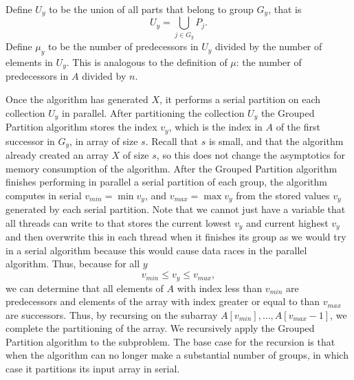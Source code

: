 \documentclass[twocolumn, twoside, 12pt]{article}
\begin{document}
Define $U_y$ to be the union of all parts that belong to group $G_y$, that is
$$U_y = \bigcup_{j\in G_y} P_j.$$
Define $\mu_y$ to be the number of predecessors in $U_y$ divided by the number of elements in $U_y$. This is analogous to the definition of $\mu$: the number of predecessors in $A$ divided by $n$.

Once the algorithm has generated $X$, it performs a serial partition on each collection $U_y$ in parallel. 
After partitioning the collection $U_y$ the Grouped Partition algorithm stores the index $v_y$, which is the index in $A$ of the first successor in $G_y$, in array of size $s$.
Recall that $s$ is small, and that the algorithm already created an array $X$ of size $s$, so this does not change the asymptotics for memory consumption of the algorithm.
After the Grouped Partition algorithm finishes performing in parallel a serial partition of each group, the algorithm computes in serial $v_{min} =\min v_y$, and $v_{max} = \max{v_y}$ from the stored values $v_y$ generated by each serial partition.
Note that we cannot just have a variable that all threads can write to that stores the current lowest $v_y$ and current highest $v_y$ and then overwrite this in each thread when it finishes its group as we would try in a serial algorithm because this would cause data races in the parallel algorithm.
Thus, because for all $y$ 
$$v_{min}\leq v_{y} \leq v_{max},$$
we can determine that all elements of $A$ with index less than $v_{min}$ are predecessors and elements of the array with index greater or equal to than $v_{max}$ are successors.
Thus, by recursing on the subarray $A[v_{min}],\ldots,A[v_{max}-1]$, we complete the partitioning of the array.
We recursively apply the Grouped Partition algorithm to the subproblem.
The base case for the recursion is that when the algorithm can no longer make a substantial number of groups, in which case it partitions its input array in serial. 
\end{document}
